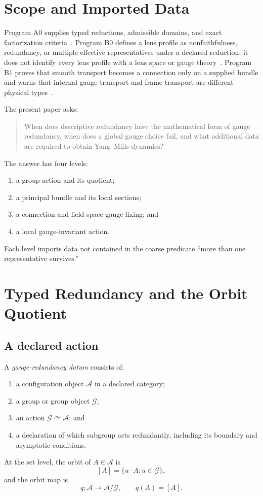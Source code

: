 \documentclass[11pt]{article}
\newcommand{\Conn}{\mathcal A}
\newcommand{\Gg}{\mathcal G}
\begin{document}
\section{Scope and Imported Data}

Program A0 supplies typed reductions, admissible domains, and exact
factorization criteria~\cite{A0}.  Program B0 defines a lens profile as
nonfaithfulness, redundancy, or multiple effective representatives under a
declared reduction; it does not identify every lens profile with a lens space
or gauge theory~\cite{B0}.  Program B1 proves that smooth transport becomes a
connection only on a supplied bundle and warns that internal gauge transport
and frame transport are different physical types~\cite{B1}.

The present paper asks:
\begin{quote}
When does descriptive redundancy have the mathematical form of gauge
redundancy, when does a global gauge choice fail, and what additional data are
required to obtain Yang--Mills dynamics?
\end{quote}

The answer has four levels:
\begin{enumerate}
\item a group action and its quotient;
\item a principal bundle and its local sections;
\item a connection and field-space gauge fixing; and
\item a local gauge-invariant action.
\end{enumerate}
Each level imports data not contained in the coarse predicate ``more than one
representative survives.''

\section{Typed Redundancy and the Orbit Quotient}

\subsection{A declared action}

\begin{definition}\label{def:gauge-datum}
A \emph{gauge-redundancy datum} consists of:
\begin{enumerate}
\item a configuration object $\Conn$ in a declared category;
\item a group or group object $\Gg$;
\item an action $\Gg\curvearrowright\Conn$; and
\item a declaration of which subgroup acts redundantly, including its boundary
and asymptotic conditions.
\end{enumerate}
At the set level, the orbit of $A\in\Conn$ is
\[
 [A]=\{u\cdot A:u\in\Gg\},
\]
and the orbit map is
\[
 q:\Conn\longrightarrow\Conn/\Gg,\qquad q(A)=[A].
\]
\end{definition}
\end{document}

